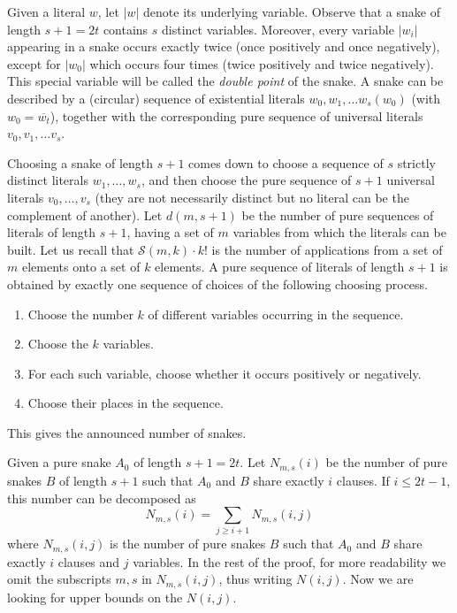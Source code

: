 \documentclass[aop,noinfoline]{imsart}
\renewcommand{\Box}{{\vrule width0.6ex height1em depth0cm}}
\newenvironment{proof}{\noindent{\bf Proof:}}{\hfill \Box}
\newcommand{\negate}[1]{\overline{#1}}
\newcommand{\calS}{{\mathcal{S}}}
\begin{document}
\begin{proof}
Given a literal $w$, let $\vert w\vert$ denote its underlying variable. Observe that a snake of length $s+1=2t$ contains $s$ distinct variables.  Moreover, every variable $\vert w_i\vert$ appearing in a snake occurs exactly twice (once positively and once negatively), except for $\vert w_0\vert$ which occurs four times (twice positively and twice negatively). This special variable will be called the \emph{double point} of the snake. A snake can be   described by a (circular) sequence of existential literals $w_0, w_1,\ldots w_s (w_0)$ (with $w_0=\negate{w_t}$), together with the corresponding pure sequence of universal literals $v_0, v_1,\ldots v_s$. 

Choosing a snake  of length $s+1$ comes down to choose a sequence of  $s$ strictly distinct
literals $w_{1},\ldots
  ,w_{s}$,   and then   choose the pure sequence of $s+1$ universal literals $v_0, \ldots,
  v_s$ (they are not necessarily distinct but no literal can be the
  complement of another).
  Let $d(m,s+1)$ be the number of pure sequences of literals of length
  $s+1$, having a set of $m$ variables from which the literals can be
  built.  Let us recall that $\calS (m,k)\cdot k!$ is the number of
  applications from a set of $m$ elements onto a set of $k$ elements.
  A pure sequence of literals of length $s+1$ is obtained by exactly
  one sequence of choices of the following choosing process.
  \begin{enumerate}
  \item Choose the number $k$ of different variables occurring in the
    sequence.
  \item Choose the $k$ variables.
  \item For each such variable, choose whether it occurs positively or
    negatively.
  \item Choose their places in the sequence.
  \end{enumerate}
This gives the announced number of snakes.
\medskip

Given a pure snake $A_0$ of length $s+1=2t$. Let $N_{m,s}(i)$ be the
number of pure snakes $B$ of length $s+1$  such  that $A_0$ and $B$ share exactly  $i$
clauses. If $i\leq 2t-1$, this number can be decomposed as
$$N_{m,s}(i)=\sum_{j\ge i+1} N_{m,s}(i,j)$$ where $N_{m,s}(i,j)$ is the number of  pure snakes $B$ such  that $A_0$ and $B$ share exactly  $i$ clauses and $j$ variables. In the rest of the proof, for more readability we omit the subscripts $m,s$ in $N_{m,s}(i,j)$, thus writing $N(i,j)$. Now we are looking for  upper bounds on the $N(i,j)$.


\end{proof}
\end{document}
